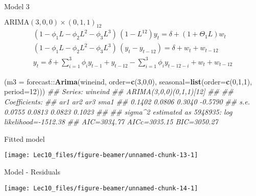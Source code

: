 \documentclass[11pt,ignorenonframetext,]{beamer}
\newenvironment{Shaded}{}{}
\newcommand{\CommentTok}[1]{\textcolor[rgb]{0.38,0.63,0.69}{\textit{#1}}}
\newcommand{\DataTypeTok}[1]{\textcolor[rgb]{0.56,0.13,0.00}{#1}}
\newcommand{\DecValTok}[1]{\textcolor[rgb]{0.25,0.63,0.44}{#1}}
\newcommand{\KeywordTok}[1]{\textcolor[rgb]{0.00,0.44,0.13}{\textbf{#1}}}
\newcommand{\NormalTok}[1]{#1}
\newcommand{\OperatorTok}[1]{\textcolor[rgb]{0.40,0.40,0.40}{#1}}
\let\oldShaded\Shaded
\let\endoldShaded\endShaded
\renewenvironment{Shaded}{\footnotesize\begin{spacing}{0.9}\oldShaded}{\endoldShaded\end{spacing}}
\begin{document}
\begin{frame}[fragile]{Model 3}
\protect\hypertarget{model-3}{}

\(\text{ARIMA}(3,0,0) \times (0,1,1)_{12}\) \[
\begin{aligned}
(1-\phi_1 L - \phi_2 L^2 - \phi_3 L^3) \, (1-L^{12}) y_t = \delta + (1 + \Theta_1 L)w_t \\
(1-\phi_1 L - \phi_2 L^2 - \phi_3 L^3) \, (y_t-y_{t-12}) = \delta + w_t + w_{t-12} \\
y_t = \delta + \sum_{i=1}^3 \phi_i y_{t-1}  + y_{t-12}  - \sum_{i=1}^3 \phi_i y_{t-12-i} + w_t + w_{t-12}
\end{aligned}
\]

\begin{Shaded}
\begin{Highlighting}[]
\NormalTok{(}\DataTypeTok{m3 =}\NormalTok{ forecast}\OperatorTok{::}\KeywordTok{Arima}\NormalTok{(wineind, }\DataTypeTok{order=}\KeywordTok{c}\NormalTok{(}\DecValTok{3}\NormalTok{,}\DecValTok{0}\NormalTok{,}\DecValTok{0}\NormalTok{), }
                      \DataTypeTok{seasonal=}\KeywordTok{list}\NormalTok{(}\DataTypeTok{order=}\KeywordTok{c}\NormalTok{(}\DecValTok{0}\NormalTok{,}\DecValTok{1}\NormalTok{,}\DecValTok{1}\NormalTok{), }\DataTypeTok{period=}\DecValTok{12}\NormalTok{)))}
\CommentTok{## Series: wineind }
\CommentTok{## ARIMA(3,0,0)(0,1,1)[12] }
\CommentTok{## }
\CommentTok{## Coefficients:}
\CommentTok{##          ar1     ar2     ar3     sma1}
\CommentTok{##       0.1402  0.0806  0.3040  -0.5790}
\CommentTok{## s.e.  0.0755  0.0813  0.0823   0.1023}
\CommentTok{## }
\CommentTok{## sigma^2 estimated as 5948935:  log likelihood=-1512.38}
\CommentTok{## AIC=3034.77   AICc=3035.15   BIC=3050.27}
\end{Highlighting}
\end{Shaded}

\end{frame}

\begin{frame}{Fitted model}
\protect\hypertarget{fitted-model-3}{}

\begin{center}\texttt{[image: Lec10\_files/figure-beamer/unnamed-chunk-13-1]} \end{center}

\end{frame}

\begin{frame}{Model - Residuals}
\protect\hypertarget{model---residuals}{}

\begin{center}\texttt{[image: Lec10\_files/figure-beamer/unnamed-chunk-14-1]} \end{center}

\end{frame}
\end{document}
